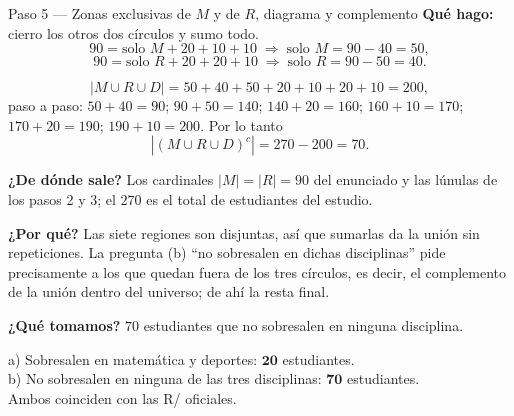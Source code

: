 \documentclass[11pt]{article}
\begin{document}
\begin{paso}{Paso 5 --- Zonas exclusivas de $M$ y de $R$, diagrama y complemento}
\textbf{Qué hago:} cierro los otros dos círculos y sumo todo.
\[
90 = \text{solo }M + 20 + 10 + 10 \;\Longrightarrow\; \text{solo }M = 90-40 = 50,
\]
\[
90 = \text{solo }R + 20 + 20 + 10 \;\Longrightarrow\; \text{solo }R = 90-50 = 40 .
\]

\begin{center}
\end{center}

\[
|M\cup R\cup D| = 50+40+50+20+10+20+10 = 200,
\]
paso a paso: $50+40=90$; $90+50=140$; $140+20=160$; $160+10=170$; $170+20=190$; $190+10=200$. Por lo tanto
\[
|(M\cup R\cup D)^{c}| = 270-200 = 70 .
\]

\textbf{¿De dónde sale?} Los cardinales $|M|=|R|=90$ del enunciado y las lúnulas de los pasos 2 y 3; el
$270$ es el total de estudiantes del estudio.

\textbf{¿Por qué?} Las siete regiones son disjuntas, así que sumarlas da la unión sin repeticiones. La
pregunta (b) ``no sobresalen en dichas disciplinas'' pide precisamente a los que quedan fuera de los tres
círculos, es decir, el complemento de la unión dentro del universo; de ahí la resta final.

\textbf{¿Qué tomamos?} $70$ estudiantes que no sobresalen en ninguna disciplina.
\end{paso}

\begin{resp}
a) Sobresalen en matemática y deportes: $\mathbf{20}$ estudiantes.\\
b) No sobresalen en ninguna de las tres disciplinas: $\mathbf{70}$ estudiantes.\\
Ambos coinciden con las R/ oficiales.
\end{resp}

\end{document}
